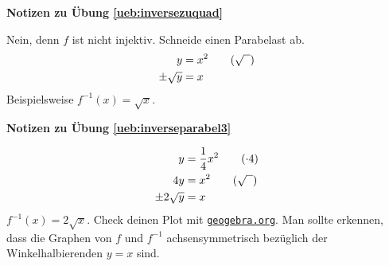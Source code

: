 \documentclass[%
<<<<<<< Updated upstream
11pt,%
twoside,%
titlepage,%
german,%
=======
11pt,%
twoside,%
titlepage,%
swissgerman,%
>>>>>>> Stashed changes
headsepline%
]{scrartcl}
\newcommand{\geogebralink}{\href{https://www.geogebra.org/calculator}{\texttt{geogebra.org}}}
\newcommand{\faReturnGray}{\textcolor{gray}{\faMailReply}} %
\newcommand{\geogebralink}{\href{https://www.geogebra.org/calculator}{\texttt{geogebra.org}}}
\theoremstyle{definition}
\theoremstyle{plain}
\newcommand{\concatueb}[1]{ueb:#1}%
\newcommand{\concatlsg}[1]{lsg:#1}%
\newenvironment{lsg}[1]{%
    \par\noindent\textbf{Notizen zu Übung \ref{\concatueb{#1}}}\label{\concatlsg{#1}}
    \hfill\hyperref[\concatueb{#1}]{\faReturnGray}\par %
}{%
    \par%
}
\newcommand{\concatueb}[1]{ueb:#1}%
\newcommand{\concatlsg}[1]{lsg:#1}%
\newenvironment{lsg}[1]{%
    \par\noindent\textbf{Notizen zu Übung \ref{\concatueb{#1}}.}%
    \label{\concatlsg{#1}}
}{%
    \par%
}
\begin{document}
\begin{lsg}	{inversezuquad}
Nein, denn $f$ ist nicht injektiv. Schneide einen Parabelast ab.
\begin{align*}
y &= x^2\tag{$\sqrt{\phantom{x}}$}\\
\pm\sqrt{y} &= x
\end{align*}
Beispielsweise $f^{-1}(x)=\sqrt{x}$.
\end{lsg}
\begin{lsg}{inverseparabel3}
\begin{align*}
y&=\frac{1}{4}x^2\tag{$\cdot 4$}\\
4y&=x^2\tag{$\sqrt{\phantom{x}}$}\\
\pm2\sqrt{y} &=x\notag
\end{align*}
$f^{-1}(x)=2\sqrt{x}$. Check deinen Plot mit \geogebralink. Man sollte erkennen, dass die Graphen von $f$ und $f^{-1}$ achsensymmetrisch bezüglich der Winkelhalbierenden $y=x$ sind.
\end{lsg}
\end{document}
